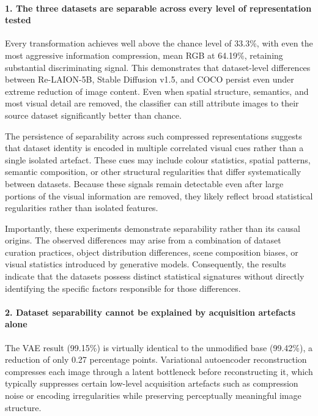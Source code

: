 \paragraph{1. The three datasets are separable across every level of representation tested}

Every transformation achieves well above the chance level of 33.3\%, with even the most aggressive information compression, mean RGB at 64.19\%, retaining substantial discriminating signal. This demonstrates that dataset-level differences between Re-LAION-5B, Stable Diffusion v1.5, and COCO persist even under extreme reduction of image content. Even when spatial structure, semantics, and most visual detail are removed, the classifier can still attribute images to their source dataset significantly better than chance.

The persistence of separability across such compressed representations suggests that dataset identity is encoded in multiple correlated visual cues rather than a single isolated artefact. These cues may include colour statistics, spatial patterns, semantic composition, or other structural regularities that differ systematically between datasets. Because these signals remain detectable even after large portions of the visual information are removed, they likely reflect broad statistical regularities rather than isolated features.

Importantly, these experiments demonstrate separability rather than its causal origins. The observed differences may arise from a combination of dataset curation practices, object distribution differences, scene composition biases, or visual statistics introduced by generative models. Consequently, the results indicate that the datasets possess distinct statistical signatures without directly identifying the specific factors responsible for those differences.

\paragraph{2. Dataset separability cannot be explained by acquisition artefacts alone}

The VAE result (99.15\%) is virtually identical to the unmodified base (99.42\%), a reduction of only 0.27 percentage points. Variational autoencoder reconstruction compresses each image through a latent bottleneck before reconstructing it, which typically suppresses certain low-level acquisition artefacts such as compression noise or encoding irregularities while preserving perceptually meaningful image structure.

